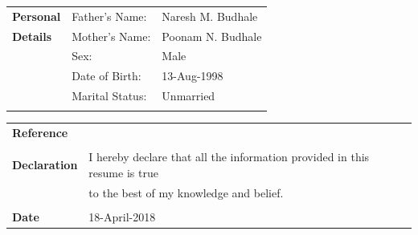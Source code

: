 \documentclass[a4paper,11pt,oneside]{article}
\begin{document}
\noindent
\vspace{-1.5em}
\begin{tabular}{@{} p{} p{} p{\textwidth}}
 \textbf{\large{Personal}}           & Father's Name:  & Naresh M. Budhale \\
 \textbf{\large{Details}}            & Mother's Name:  & Poonam N. Budhale \\
                            & Sex:            & Male \\
                            & Date of Birth:  & 13-Aug-1998 \\
                            & Marital Status: & Unmarried \\ \\
\end{tabular}
\noindent \begin{tabular}{@{} p{} p{\textwidth}}
 \vspace{1em}
 \textbf{\large{Reference}} & \\ \\
 \textbf{\large{Declaration}}
    & I hereby declare that all the information provided in this resume is true \\
    & to the best of my knowledge and belief. \\ \\
 \textbf{\large{Date}} & 18-April-2018 \\
 
\end{tabular}


\clearpage
\end{document}
